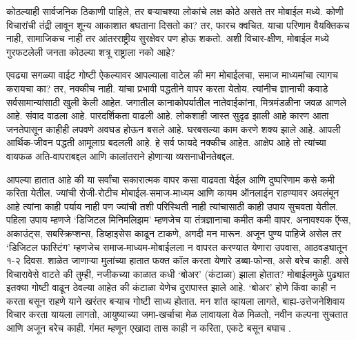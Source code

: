कोठल्याही सार्वजनिक ठिकाणी पाहिले, तर बऱ्याचश्या लोकांचे लक्ष कोठे असते तर मोबाईल मध्ये. कोणी विचारांची तंद्री लावून शून्य आकाशात बघताना दिसतो का? तर, फारच क्वचित. याचा परिणाम वैयक्तिकच नाही, सामाजिकच नाही तर आंतरराष्ट्रीय सुरक्षेवर पण होऊ शकतो. अशी विचार-क्षीण, मोबाईल मध्ये गुरफटलेली जनता कोठल्या शत्रू राष्ट्राला नको आहे?

एवढ्या सगळ्या वाईट गोष्टी ऐकल्यावर आपल्याला वाटेल की मग मोबाईलचा, समाज माध्यमांचा त्यागच करायचा का? तर, नक्कीच नाही. यांचा प्रभावी पद्धतीने वापर करता येतोय. त्यांनीच ज्ञानाची कवाडे सर्वसामान्यांसाठी खुली केली आहेत. जगातील कानाकोपर्यातील नातेवाईकांना, मित्रमंडळीना जवळ आणले आहे. संवाद वाढला आहे. पारदर्शिकता वाढली आहे. लोकशाही जास्त सुदृढ झाली आहे कारण आता जनतेपासून काहीही लपवणे अवघड होऊन बसले आहे. घरबसल्या काम करणे शक्य झाले आहे. आपली आर्थिक-जीवन पद्धती आमूलाग्र बदलली आहे. हे सर्व फायदे नक्कीच आहेत. आक्षेप आहे तो त्यांच्या वायफळ अति-वापराबद्दल आणि कालांतराने होणाऱ्या व्यसनाधीनतेबद्दल.

आपल्या हातात आहे की या सर्वांचा सकारात्मक वापर कसा वाढवता येईल आणि दुष्परिणाम कसे कमी करिता येतील. ज्यांची रोजी-रोटीच मोबाईल-समाज-माध्यम आणि कायम ऑनलाईन राहण्यावर अवलंबून आहे त्यांना काही पर्याय नाही पण ज्यांची तशी परिस्थिती नाही त्यांचासाठी काही उपाय सुचवता येतील. पहिला उपाय म्हणजे `डिजिटल मिनिमलिझम' म्हणजेच या तंत्रज्ञानाचा कमीत कमी वापर. अनावश्यक ऍप्स, अकाउंट्स, सबस्क्रिप्शन्स, डिव्हाइसेस काढून टाकणे, अगदी मन मारून. अजून पुण्य पाहिजे असेल तर `डिजिटल फास्टिंग' म्हणजेच समाज-माध्यम-मोबाईलला न वापरत करण्यात येणारा उपवास, आठवड्यातून १-२ दिवस. शाळेत जाणाऱ्या मुलांच्या हातात फक्त कॉल करता येणारे डब्बा-फोन्स, असे बरेच काही. असे विचारावेसे वाटते की तुम्ही, नजीकच्या काळात कधी `बोअर' (कंटाळा) झाला होतात? मोबाईलमुळे पुढ्यात इतक्या गोष्टी वाढून ठेवल्या आहेत की कंटाळा येणेच दुरापास्त झाले आहे. `बोअर' होणे किंवा काही न करता बसून राहणे याने खरंतर बऱ्याच गोष्टी साध्य होतात. मन शांत व्हायला लागते, बाह्य-उत्तेजनेशिवाय विचार करता यायला लागतो, आयुष्याच्या जमा-खर्चाचा मेळ लावायला वेळ मिळतो, नवीन कल्पना सुचतात आणि अजून बरेच काही. गंमत म्हणून एखादा तास काही न करिता, एकटे बसून बघाच .